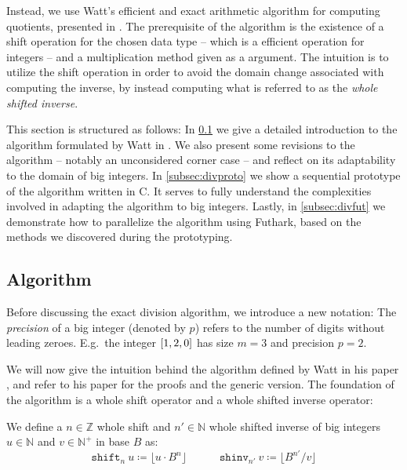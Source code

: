 Instead, we use Watt's efficient and exact arithmetic algorithm for computing
quotients, presented in \cite{watt2023efficient}. The prerequisite of the
algorithm is the existence of a shift operation for the chosen data type -- which
is a efficient operation for integers -- and a multiplication method given as a
argument. The intuition is to utilize the shift operation in order to avoid the
domain change associated with computing the inverse, by instead computing what
is referred to as the \textit{whole shifted inverse}.

This section is structured as follows: In \ref{subsec:divalg} we give a detailed
introduction to the algorithm formulated by Watt in \cite{watt2023efficient}. We
also present some revisions to the algorithm -- notably an unconsidered corner
case -- and reflect on its adaptability to the domain of big integers. In
\ref{subsec:divproto} we show a sequential prototype of the algorithm written in
C. It serves to fully understand the complexities involved in adapting the
algorithm to big integers. Lastly, in \ref{subsec:divfut} we demonstrate how to
parallelize the algorithm using Futhark, based on the methods we discovered
during the prototyping.

\subsection{Algorithm}
\label{subsec:divalg}

Before discussing the exact division algorithm, we introduce a new notation: The
\textit{precision} of a big integer (denoted by $p$) refers to the number of
digits without leading zeroes. E.g.\ the integer $\mathtt{[}1,2,0\mathtt{]}$ has size $m=3$
and precision $p=2$.

We will now give the intuition behind the algorithm defined by Watt in his paper
\cite{watt2023efficient}, and refer to his paper for the proofs and the generic
version. The foundation of the algorithm is a whole shift operator and a whole
shifted inverse operator:

\begin{definition}
  We define a $n \in \mathbb{Z}$ whole shift and $n' \in \mathbb{N}$ whole shifted inverse of big
  integers $u\in \mathbb{N}$ and $v\in \mathbb{N}^{+}$ in base $B$ as:
  \begin{equation}\label{eq:shifts}
    \mathtt{shift}_n~u \coloneq \lfloor u \cdot B^n \rfloor \quad \qquad \mathtt{shinv}_{n'}~v \coloneq \lfloor B^{n'}/ v \rfloor
    \end{equation}
\end{definition}

